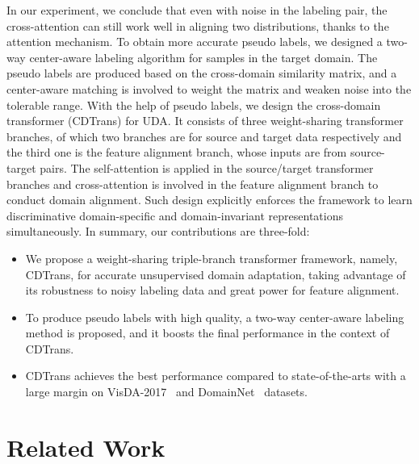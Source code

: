 \documentclass[dvipsnames, svgnames, x11names, table]{article} \usepackage{iclr2022_conference,times}
\begin{document}
\begin{spacing}{1.0}
In our experiment, we conclude that even with noise in the labeling pair, the cross-attention can still work well in aligning two distributions, thanks to the attention mechanism. To obtain more accurate pseudo labels, we designed a two-way center-aware labeling algorithm for samples in the target domain. The pseudo labels are produced based on the cross-domain similarity matrix, and a center-aware matching is involved to weight the matrix and weaken noise into the tolerable range. With the help of pseudo labels, we design the cross-domain transformer (CDTrans) for UDA. It consists of three weight-sharing transformer branches, of which two branches are for source and target data respectively and the third one is the feature alignment branch, whose inputs are from source-target pairs. The self-attention is applied in the source/target transformer branches and cross-attention is involved in the feature alignment branch to conduct domain alignment. Such design explicitly enforces the framework to learn discriminative domain-specific and domain-invariant representations simultaneously.
In summary, our contributions are three-fold:
\begin{itemize}
\item We propose a weight-sharing triple-branch transformer framework, namely, CDTrans, for accurate unsupervised domain adaptation, taking advantage of its robustness to noisy labeling data and great power for feature alignment.
\item To produce pseudo labels with high quality, a two-way center-aware labeling method is proposed, and it boosts the final performance in the context of CDTrans.
\item CDTrans achieves the best performance compared to state-of-the-arts with a large margin on VisDA-2017~\citep{visda2017} and DomainNet~\citep{peng2019moment} datasets.
\end{itemize}



\section{Related Work}

\end{spacing}
\end{document}
